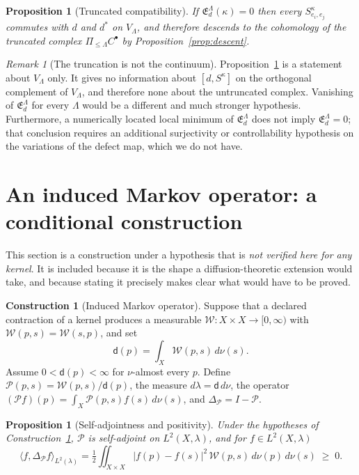 \documentclass[11pt]{amsart}
\newtheorem{proposition}[theorem]{Proposition}
\theoremstyle{definition}
\newtheorem{construction}[theorem]{Construction}
\theoremstyle{remark}
\newtheorem{remark}[theorem]{Remark}
\newcommand{\Energy}{\mathfrak E}
\begin{document}
\begin{proposition}[Truncated compatibility]
\label{prop:truncated}
If $\Energy_d^{\Lambda}(\kappa)=0$ then every $S^{\kappa}_{e_i,e_j}$ commutes with $d$ and
$d^{*}$ \emph{on $V_\Lambda$}, and therefore descends to the cohomology of the truncated
complex $\Pi_{\le\Lambda}C^{\bullet}$ by Proposition~\ref{prop:descent}.
\end{proposition}

\begin{remark}[The truncation is not the continuum]
\label{rem:truncation}
Proposition~\ref{prop:truncated} is a statement about $V_\Lambda$ only. It gives no
information about $[d,S^{\kappa}]$ on the orthogonal complement of $V_\Lambda$, and
therefore none about the untruncated complex. Vanishing of $\Energy_d^{\Lambda}$ for every
$\Lambda$ would be a different and much stronger hypothesis. Furthermore, a numerically
located local minimum of $\Energy_d^{\Lambda}$ does not imply
$\Energy_d^{\Lambda}=0$; that conclusion requires an additional surjectivity or
controllability hypothesis on the variations of the defect map, which we do not have.
\end{remark}

\section{An induced Markov operator: a conditional construction}
\label{sec:markov}

This section is a construction under a hypothesis that is \emph{not verified here for any
kernel}. It is included because it is the shape a diffusion-theoretic extension would
take, and because stating it precisely makes clear what would have to be proved.

\begin{construction}[Induced Markov operator]
\label{constr:markov}
Suppose that a declared contraction of a kernel produces a measurable
$\mathcal W:X\times X\to[0,\infty)$ with $\mathcal W(p,s)=\mathcal W(s,p)$, and set
\[
 \mathsf d(p)=\int_X\mathcal W(p,s)\,d\nu(s).
\]
Assume $0<\mathsf d(p)<\infty$ for $\nu$-almost every $p$. Define
$\mathcal P(p,s)=\mathcal W(p,s)/\mathsf d(p)$, the measure $d\lambda=\mathsf d\,d\nu$, the
operator $(\mathcal Pf)(p)=\int_X\mathcal P(p,s)f(s)\,d\nu(s)$, and
$\Delta_{\mathcal P}=I-\mathcal P$.
\end{construction}

\begin{proposition}[Self-adjointness and positivity]
\label{prop:markov}
Under the hypotheses of Construction~\ref{constr:markov}, $\mathcal P$ is self-adjoint on
$L^{2}(X,\lambda)$, and for $f\in L^{2}(X,\lambda)$
\[
 \langle f,\Delta_{\mathcal P}f\rangle_{L^{2}(\lambda)}
 =\tfrac12\iint_{X\times X}\lvert f(p)-f(s)\rvert^{2}\,\mathcal W(p,s)\,d\nu(p)\,d\nu(s)
 \;\ge\;0 .
\]
\end{proposition}
\end{document}
